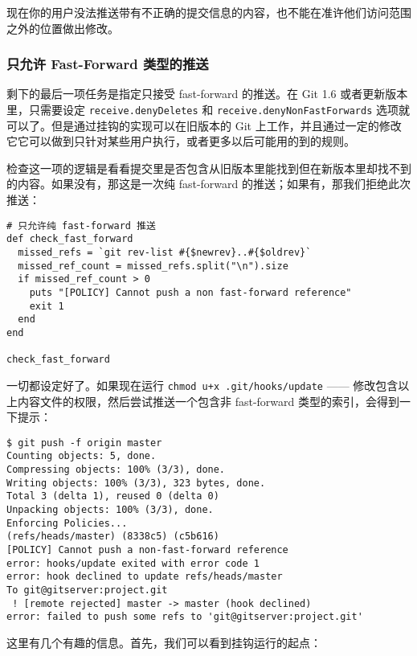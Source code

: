 \documentclass[a4paper]{book}
\begin{document}
现在你的用户没法推送带有不正确的提交信息的内容，也不能在准许他们访问范围之外的位置做出修改。

\subsubsection{只允许 Fast-Forward 类型的推送}

剩下的最后一项任务是指定只接受 fast-forward 的推送。在 Git 1.6 或者更新版本里，只需要设定 \texttt{receive.denyDeletes} 和 \texttt{receive.denyNonFastForwards} 选项就可以了。但是通过挂钩的实现可以在旧版本的 Git 上工作，并且通过一定的修改它它可以做到只针对某些用户执行，或者更多以后可能用的到的规则。

检查这一项的逻辑是看看提交里是否包含从旧版本里能找到但在新版本里却找不到的内容。如果没有，那这是一次纯 fast-forward 的推送；如果有，那我们拒绝此次推送：

\begin{shaded}\begin{verbatim}
# 只允许纯 fast-forward 推送
def check_fast_forward
  missed_refs = `git rev-list #{$newrev}..#{$oldrev}`
  missed_ref_count = missed_refs.split("\n").size
  if missed_ref_count > 0
    puts "[POLICY] Cannot push a non fast-forward reference"
    exit 1
  end
end

check_fast_forward
\end{verbatim}\end{shaded}

一切都设定好了。如果现在运行 \texttt{chmod u+x .git/hooks/update} ------ 修改包含以上内容文件的权限，然后尝试推送一个包含非 fast-forward 类型的索引，会得到一下提示：

\begin{shaded}\begin{verbatim}
$ git push -f origin master
Counting objects: 5, done.
Compressing objects: 100% (3/3), done.
Writing objects: 100% (3/3), 323 bytes, done.
Total 3 (delta 1), reused 0 (delta 0)
Unpacking objects: 100% (3/3), done.
Enforcing Policies... 
(refs/heads/master) (8338c5) (c5b616)
[POLICY] Cannot push a non-fast-forward reference
error: hooks/update exited with error code 1
error: hook declined to update refs/heads/master
To git@gitserver:project.git
 ! [remote rejected] master -> master (hook declined)
error: failed to push some refs to 'git@gitserver:project.git'
\end{verbatim}\end{shaded}

这里有几个有趣的信息。首先，我们可以看到挂钩运行的起点：
\end{document}
